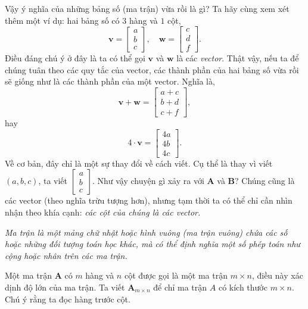 Vậy ý nghĩa của những bảng số (ma trận) vừa rồi là gì? Ta hãy cùng xem xét thêm một ví dụ: hai bảng số có \(3\) hàng và \(1\) cột, 
\[\mathbf{v}=\begin{bmatrix}
    a\\b\\c
\end{bmatrix}, \quad \mathbf{w}=\begin{bmatrix}
    c\\d\\f
\end{bmatrix}.
\] Điều đáng chú ý ở đây là ta có thể gọi \(\mathbf{v}\) và \(\mathbf{w}\) là các \emph{vector}. Thật vậy, nếu ta để chúng tuân theo các quy tắc của vector, các thành phần của hai bảng số vừa rồi sẽ giống như là các thành phần của một vector. 
Nghĩa là, \[\mathbf{v}+\mathbf{w}=\begin{bmatrix}
    a+c\\b+d\\c+f
\end{bmatrix},\] hay \[
    4\cdot\mathbf{v}=\begin{bmatrix}
        4a\\4b\\4c
\end{bmatrix}.\]
Về cơ bản, đây chỉ là một sự thay đổi về cách viết. Cụ thể là thay vì viết \((a,b,c)\), ta viết \(\begin{bmatrix}
    a\\b\\c
\end{bmatrix}\). Như vậy chuyện gì xảy ra với  \(\mathbf{A}\) và \(\mathbf{B} \)? Chúng cũng là các vector (theo nghĩa trừu tượng hơn), nhưng tạm thời ta có thể chỉ cần nhìn nhận theo khía cạnh: \emph{các cột của chúng là các vector. }
\vspace{8pt}

    \emph{Ma trận là một mảng chữ nhật hoặc hình vuông (ma trận vuông) chứa các số hoặc những đối tượng toán học khác, mà có thể định nghĩa một số phép toán như cộng hoặc nhân trên các ma trận.}
\vspace{8pt}

Một ma trận \(\mathbf{A}\) có \(m\) hàng và \(n\) cột được gọi là một ma trận \(m\times n\), điều này xác dịnh độ lớn của ma trận. Ta viết \(\mathbf{A}_{m\times n}\) để chỉ ma trận \(A\) có kích thước \(m\times n\). Chú ý rằng ta đọc hàng trước cột. 
\vspace{8pt}

